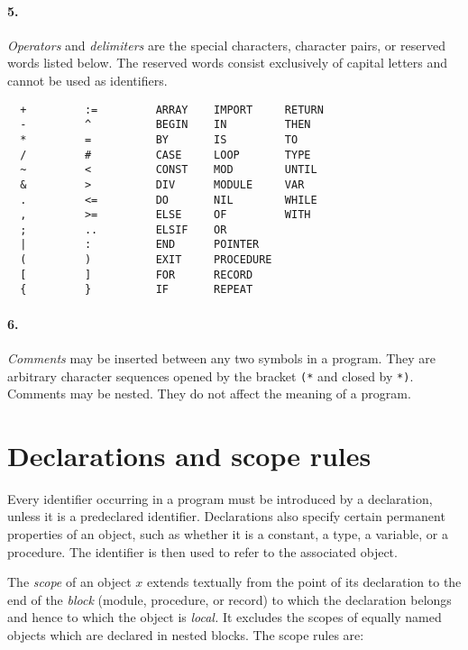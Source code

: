 \paragraph{\rm 5.} {\em Operators} and {\em delimiters} are the special
characters, character pairs, or reserved words listed below. The reserved
words consist exclusively of capital letters and cannot be used as
identifiers.
\begin{verbatim}
  +         :=         ARRAY    IMPORT     RETURN
  -         ^          BEGIN    IN         THEN
  *         =          BY       IS         TO
  /         #          CASE     LOOP       TYPE
  ~         <          CONST    MOD        UNTIL
  &         >          DIV      MODULE     VAR
  .         <=         DO       NIL        WHILE
  ,         >=         ELSE     OF         WITH
  ;         ..         ELSIF    OR
  |         :          END      POINTER
  (         )          EXIT     PROCEDURE
  [         ]          FOR      RECORD
  {         }          IF       REPEAT
\end{verbatim}

\paragraph{\rm 6.} {\em Comments} may be inserted between any two
symbols in a program. They are arbitrary character sequences opened
by the bracket \verb|(*| and closed by \verb|*)|.
Comments may be nested. They do not affect the meaning of a program.

\section{Declarations and scope rules}\label{o2r:decls}

Every identifier occurring in a program must be introduced by a declaration,
unless it is a predeclared identifier. Declarations also specify certain
permanent properties of an object, such as whether it is a constant,
a type, a variable, or a procedure. The identifier is then used to
refer to the associated object.

The {\em  scope} of an object $x$ extends textually from the point of
its declaration to the end of the {\em block} (module, procedure,
or record) to which the declaration belongs and hence to which the
object is {\em local.} It excludes the scopes of equally named objects
which are declared in nested blocks. The scope rules are:

